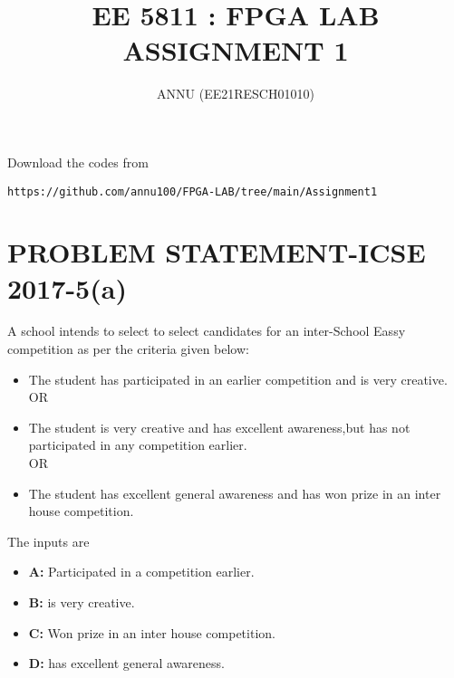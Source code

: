 \documentclass[journal,12pt,twocolumn]{IEEEtran}
\begin{document}
\renewcommand{\thefigure}{\theproblem}
\def\putbox#1#2#3{\makebox[0in][l]{\makebox[#1][l]{}\raisebox{\baselineskip}[0in][0in]{\raisebox{#2}[0in][0in]{#3}}}}
     \def\rightbox#1{\makebox[0in][r]{#1}}
     \def\centbox#1{\makebox[0in]{#1}}
     \def\topbox#1{\raisebox{-\baselineskip}[0in][0in]{#1}}
     \def\midbox#1{\raisebox{-0.5\baselineskip}[0in][0in]{#1}}
\vspace{3cm}
\title{
EE 5811 : FPGA LAB \\ ASSIGNMENT 1
}
\author{ ANNU (EE21RESCH01010)}	
\maketitle
\newpage
\bigskip
\renewcommand{\thefigure}{\theenumi}
\renewcommand{\thetable}{\theenumi}
Download the codes from
\begin{lstlisting}
https://github.com/annu100/FPGA-LAB/tree/main/Assignment1
\end{lstlisting}
\section{\textbf{PROBLEM STATEMENT-ICSE 2017-5(a)}}
A school intends to select to select candidates for an inter-School Eassy competition as per the criteria given below:
\begin{itemize}
    \item The student has participated in an earlier competition and is very creative.  \\OR
    \item The student is very creative and has excellent awareness,but has not participated in any competition earlier.  \\OR
    \item The student has excellent general awareness and has won prize in an inter house competition.
\end{itemize}
The inputs are 
\begin{itemize}
    \item \textbf{A:} Participated in a competition earlier.
    \item \textbf{B:} is very creative.
     \item \textbf{C:} Won prize in an inter house competition.
      \item \textbf{D:} has excellent general awareness.

\end{itemize}
\end{document}
